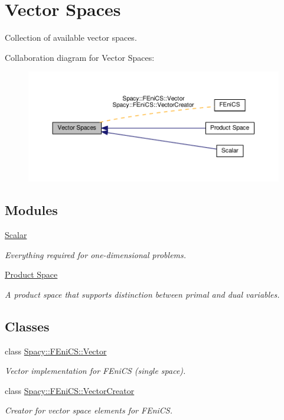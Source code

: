 \hypertarget{group__VectorSpaceGroup}{\section{Vector Spaces}
\label{group__VectorSpaceGroup}
}


Collection of available vector spaces.  


Collaboration diagram for Vector Spaces\-:
\nopagebreak
\begin{figure}[H]
\begin{center}
\leavevmode
\includegraphics[width=350pt]{group__VectorSpaceGroup}
\end{center}
\end{figure}
\subsection*{Modules}
\begin{DoxyCompactItemize}
\item 
\hyperlink{group__ScalarGroup}{Scalar}
\begin{DoxyCompactList}\small\item\em Everything required for one-\/dimensional problems. \end{DoxyCompactList}\item 
\hyperlink{group__ProductSpaceGroup}{Product Space}
\begin{DoxyCompactList}\small\item\em A product space that supports distinction between primal and dual variables. \end{DoxyCompactList}\end{DoxyCompactItemize}
\subsection*{Classes}
\begin{DoxyCompactItemize}
\item 
class \hyperlink{classSpacy_1_1FEniCS_1_1Vector}{Spacy\-::\-F\-Eni\-C\-S\-::\-Vector}
\begin{DoxyCompactList}\small\item\em Vector implementation for F\-Eni\-C\-S (single space). \end{DoxyCompactList}\item 
class \hyperlink{classSpacy_1_1FEniCS_1_1VectorCreator}{Spacy\-::\-F\-Eni\-C\-S\-::\-Vector\-Creator}
\begin{DoxyCompactList}\small\item\em Creator for vector space elements for F\-Eni\-C\-S. \end{DoxyCompactList}\end{DoxyCompactItemize}

